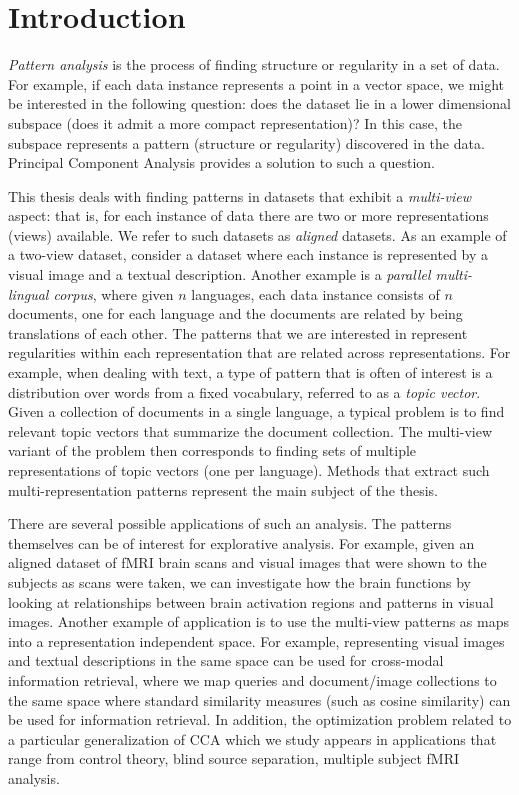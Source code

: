 %
\chapter{Introduction}

\emph{Pattern analysis} is the process of finding structure or regularity in a set of data. For example,
if each data instance represents a point in a vector space, we might be interested in the following question: does the dataset lie
in a lower dimensional subspace (does it admit a more compact representation)? In this case, the subspace represents a pattern (structure or regularity)
discovered in the data. Principal Component Analysis provides a solution to such a question.

This thesis deals with finding patterns in datasets that exhibit a \emph{multi-view} aspect: that is, for
each instance of data there are two or more representations (views) available. We refer to such datasets as
\emph{aligned} datasets. As an example of a two-view dataset, consider a dataset where each instance is represented by a visual image and
a textual description. Another example is a \emph{parallel multi-lingual corpus},
where given $n$ languages, each data instance consists of $n$ documents, one for each language and the documents are related by being
translations of each other. The patterns that we are interested in represent regularities within each representation
that are related across representations. For example, when dealing with text, a type of pattern that is often of interest
is a distribution over words from a fixed vocabulary, referred to as a \emph{topic vector}. Given a collection of documents
in a single language, a typical problem is to find relevant topic vectors that summarize the document collection. The multi-view
variant of the problem then corresponds to finding sets of multiple representations of topic vectors (one per language).
Methods that extract such multi-representation patterns represent the main subject of the thesis.

There are several possible applications of such an analysis. The patterns themselves can be of interest
for explorative analysis. For example, given an aligned dataset of fMRI brain scans and visual images that were
shown to the subjects as scans were taken, we can investigate how the brain functions by looking at
relationships between brain activation regions and patterns in visual images.
Another example of application is to use the multi-view patterns as maps into a
representation independent space. For example, representing visual images and textual descriptions in the same
space can be used for cross-modal information retrieval, where we map queries and document/image collections
to the same space where standard similarity measures (such as cosine similarity) can be used for information
retrieval. In addition, the optimization problem related to a particular generalization of CCA which we study
appears in applications that range from control theory, blind source separation, multiple subject fMRI analysis.

